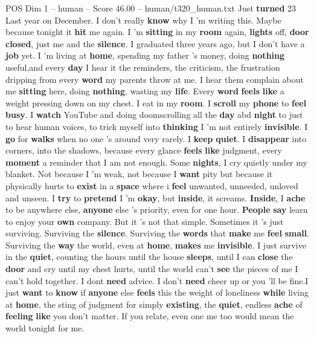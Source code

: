 \begin{textsample}{POS Dim 1 – human – Score 46.00 – human/t320\_human.txt}  \label{ex:f1_pos_034}
Just \textbf{turned} 23 Last year on December.
I don't really \textbf{know} why I ’m writing this.
Maybe because tonight it \textbf{hit} me again.
I ’m \textbf{sitting} in my \textbf{room} again, \textbf{lights} off, \textbf{door} \textbf{closed}, just me and the \textbf{silence}.
I graduated three years ago, but I don't have a \textbf{job} yet.
I ’m living at \textbf{home}, spending my father ’s money, doing \textbf{nothing} useful,and every \textbf{day} I hear it the reminders, the criticism, the frustration dripping from every \textbf{word} my parents throw at me.
I hear them complain about me \textbf{sitting} here, doing \textbf{nothing}, wasting my \textbf{life}.
Every \textbf{word} \textbf{feels} \textbf{like} a weight pressing down on my chest.
I eat in my \textbf{room}.
I \textbf{scroll} my \textbf{phone} to \textbf{feel} \textbf{busy}.
I \textbf{watch} YouTube and doing doomscrolling all the \textbf{day} abd \textbf{night} to just to hear human voices, to trick myself into \textbf{thinking} I ’m not entirely \textbf{invisible}.
I \textbf{go} for \textbf{walks} when no one ’s around very rarely.
I \textbf{keep} \textbf{quiet}.
I \textbf{disappear} into corners, into the shadows, because every glance \textbf{feels} \textbf{like} judgment, every \textbf{moment} a reminder that I am not enough.
Some \textbf{nights}, I cry quietly under my blanket.
Not because I ’m weak, not because I \textbf{want} pity but because it physically hurts to \textbf{exist} in a \textbf{space} where i \textbf{feel} unwanted, unneeded, unloved and unseen.
I \textbf{try} to \textbf{pretend} I ’m \textbf{okay}, but \textbf{inside}, it screams. \textbf{Inside}, I \textbf{ache} to be anywhere else, \textbf{anyone} else ’s priority, even for one hour. \textbf{People} \textbf{say} learn to enjoy your \textbf{own} company.
But it ’s not that simple.
Sometimes it ’s just surviving.
Surviving the \textbf{silence}.
Surviving the \textbf{words} that \textbf{make} me \textbf{feel} \textbf{small}.
Surviving the \textbf{way} the world, even at \textbf{home}, \textbf{makes} me \textbf{invisible}.
I just survive in the \textbf{quiet}, counting the hours until the house \textbf{sleeps}, until I can \textbf{close} the \textbf{door} and cry until my chest hurts, until the world can't \textbf{see} the pieces of me I can't hold together.
I dont \textbf{need} advice.
I don't \textbf{need} cheer up or you ’ll be fine.I just \textbf{want} to \textbf{know} if \textbf{anyone} else \textbf{feels} this the weight of loneliness \textbf{while} living at \textbf{home}, the sting of judgment for simply \textbf{existing}, the \textbf{quiet}, endless \textbf{ache} of \textbf{feeling} \textbf{like} you don't matter.
If you relate, even one me too would mean the world tonight for me.

\end{textsample}
